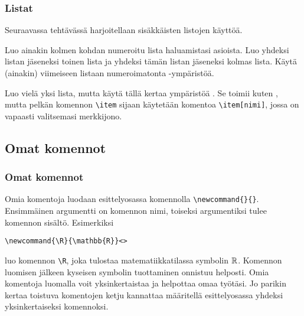 \begin{fframe}
    \frametitle{Listat}
    Seuraavassa tehtävässä harjoitellaan sisäkkäisten listojen käyttöä.
    \begin{harj}
        Luo ainakin kolmen kohdan numeroitu lista haluamistasi asioista. Luo yhdeksi listan jäseneksi toinen lista ja yhdeksi tämän listan jäseneksi kolmas lista. Käytä (ainakin) viimeiseen listaan numeroimatonta -ympäristöä.
    \end{harj}
    \begin{harj}
    Luo vielä yksi lista, mutta käytä tällä kertaa ympäristöä . Se toimii kuten , mutta pelkän komennon \lstinline-\item- sijaan käytetään komentoa \lstinline-\item[nimi]-, jossa  on vapaasti valitsemasi merkkijono.
    \end{harj}
\end{fframe}


\subsection{Omat komennot}
\begin{fframe}
    \frametitle{Omat komennot}
    Omia komentoja luodaan esittelyosassa komennolla \lstinline-\newcommand{}{}-. Ensimmäinen argumentti on komennon nimi, toiseksi argumentiksi tulee komennon sisältö. Esimerkiksi
    \begin{lstlisting}
\newcommand{\R}{\mathbb{R}}<>
    \end{lstlisting}
    luo komennon \lstinline-\R-, joka tulostaa matematiikkatilassa symbolin \(\R\). Komennon luomisen jälkeen kyseisen symbolin tuottaminen onnistuu helposti.
    \vaihto
    Omia komentoja luomalla voit yksinkertaistaa ja helpottaa omaa työtäsi. Jo parikin kertaa toistuva komentojen ketju kannattaa määritellä esittelyosassa yhdeksi yksinkertaiseksi komennoksi.
\end{fframe}

